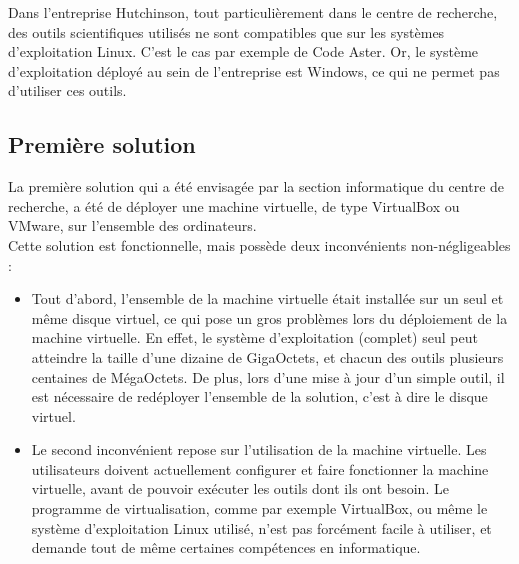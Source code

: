 Dans l'entreprise Hutchinson, tout particulièrement dans le centre de recherche, des outils scientifiques utilisés ne sont compatibles que sur les systèmes d'exploitation Linux.
C'est le cas par exemple de Code Aster.
Or, le système d'exploitation déployé au sein de l'entreprise est Windows, ce qui ne permet pas d'utiliser ces outils.
\\





\subsection{Première solution}

La première solution qui a été envisagée par la section informatique du centre de recherche, a été de déployer une machine virtuelle, de type VirtualBox ou VMware, sur l'ensemble des ordinateurs.
\\


Cette solution est fonctionnelle, mais possède deux inconvénients non-négligeables :
\begin{itemize}
	\item Tout d'abord, l'ensemble de la machine virtuelle était installée sur un seul et même disque virtuel, ce qui pose un gros problèmes lors du déploiement de la machine virtuelle.
En effet, le système d'exploitation (complet) seul peut atteindre la taille d'une dizaine de GigaOctets, et chacun des outils plusieurs centaines de MégaOctets.
De plus, lors d'une mise à jour d'un simple outil, il est nécessaire de redéployer l'ensemble de la solution, c'est à dire le disque virtuel.
	\item Le second inconvénient repose sur l'utilisation de la machine virtuelle.
Les utilisateurs doivent actuellement configurer et faire fonctionner la machine virtuelle, avant de pouvoir exécuter les outils dont ils ont besoin.
Le programme de virtualisation, comme par exemple VirtualBox, ou même le système d'exploitation Linux utilisé, n'est pas forcément facile à utiliser, et demande tout de même certaines compétences en informatique.
\\
\end{itemize}



